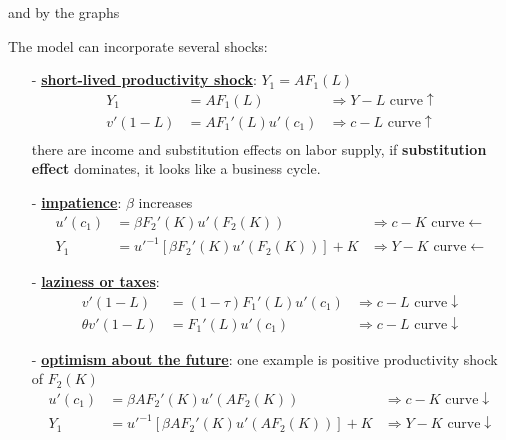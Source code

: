 \documentclass[10pt,landscape,a4paper]{article}
\begin{document}
\begin{multicols*}{3}
and by the graphs
\begin{center}
\end{center}

The model can incorporate several shocks:
\begin{itemize}
    \item[-] \underline{\textbf{short-lived productivity shock}}: $Y_1 =AF_1(L)$
    \begin{align*}
        Y_1&=AF_1(L) &\Rightarrow Y-L \text{ curve} \uparrow\\
        v'(1-L)&=AF_1'(L)u'(c_1) &\Rightarrow c-L \text{ curve} \uparrow\\
    \end{align*}
    there are income and substitution effects on labor supply, if \textbf{substitution effect} dominates, it looks like a business cycle.
    \item[-] \underline{\textbf{impatience}}: $\beta$ increases
    \begin{align*}
        u'(c_1)&=\beta F_2'(K)u'(F_2(K)) & \Rightarrow c-K \text{ curve} \leftarrow\\
    Y_1 &= u'^{-1}\left[\beta F_2'(K)u'(F_2(K))\right]+K & \Rightarrow Y-K \text{ curve} \leftarrow
    \end{align*}
    \item[-] \underline{\textbf{laziness or taxes}}:
    \begin{align*}
        v'(1-L)&=(1-\tau)F_1'(L)u'(c_1) &\Rightarrow c-L \text{ curve} \downarrow\\
        \theta v'(1-L)&=F_1'(L)u'(c_1) &\Rightarrow c-L \text{ curve} \downarrow
    \end{align*}
    \item[-] \underline{\textbf{optimism about the future}}: one example is positive productivity shock of $F_2(K)$
    \begin{align*}
        u'(c_1) &= \beta AF_2'(K)u'(AF_2(K)) &\Rightarrow c-K \text{ curve} \downarrow\\
        Y_1 &= u'^{-1}\left[\beta AF_2'(K)u'(AF_2(K))\right]+K & \Rightarrow Y-K \text{ curve} \downarrow
    \end{align*}
\end{itemize}


\end{multicols*}
\end{document}

